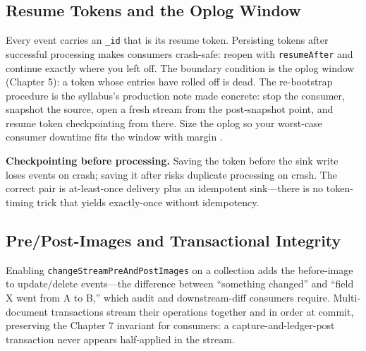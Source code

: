 \subsection{Resume Tokens and the Oplog Window}
Every event carries an \texttt{\_id} that is its resume token. Persisting tokens after successful processing makes consumers crash-safe: reopen with \texttt{resumeAfter} and continue exactly where you left off. The boundary condition is the oplog window (Chapter 5): a token whose entries have rolled off is dead. The re-bootstrap procedure is the syllabus's production note made concrete: stop the consumer, snapshot the source, open a fresh stream from the post-snapshot point, and resume token checkpointing from there. Size the oplog so your worst-case consumer downtime fits the window with margin \cite{mongodbOplogDocs}.

\begin{pitfall}
\textbf{Checkpointing before processing.} Saving the token before the sink write loses events on crash; saving it after risks duplicate processing on crash. The correct pair is at-least-once delivery plus an idempotent sink---there is no token-timing trick that yields exactly-once without idempotency.
\end{pitfall}

\subsection{Pre/Post-Images and Transactional Integrity}
Enabling \texttt{changeStreamPreAndPostImages} on a collection adds the before-image to update/delete events---the difference between ``something changed'' and ``field X went from A to B,'' which audit and downstream-diff consumers require. Multi-document transactions stream their operations together and in order at commit, preserving the Chapter 7 invariant for consumers: a capture-and-ledger-post transaction never appears half-applied in the stream.

